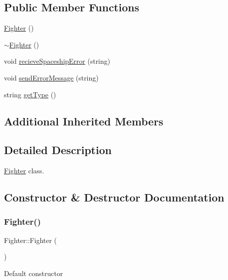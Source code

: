 \subsection*{Public Member Functions}
\begin{DoxyCompactItemize}
\item 
\hyperlink{classFighter_ae1d4ac29ed8dac91af41e6396ee00dda}{Fighter} ()
\item 
\hyperlink{classFighter_a7c7f2ffa4724887e564af51a6154b703}{$\sim$\+Fighter} ()
\item 
void \hyperlink{classFighter_aecd2761c68aed8499e210fd0ca11c447}{recieve\+Spaceship\+Error} (string)
\item 
void \hyperlink{classFighter_a42b60e52427e5c69daf141351655805c}{send\+Error\+Message} (string)
\item 
string \hyperlink{classFighter_ae8bd1a16211422b1898f41dec347281c}{get\+Type} ()
\end{DoxyCompactItemize}
\subsection*{Additional Inherited Members}


\subsection{Detailed Description}
\hyperlink{classFighter}{Fighter} class. 

\subsection{Constructor \& Destructor Documentation}
\mbox{\label{classFighter_ae1d4ac29ed8dac91af41e6396ee00dda}} 
\subsubsection{\texorpdfstring{Fighter()}{Fighter()}}
{\footnotesize\ttfamily Fighter\+::\+Fighter (\begin{DoxyParamCaption}{ }\end{DoxyParamCaption})\hspace{0.3cm}{\ttfamily [inline]}}

Default constructor \mbox{\label{classFighter_a7c7f2ffa4724887e564af51a6154b703}} 
